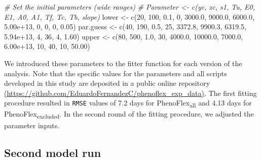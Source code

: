 \documentclass[
]{article}
\newenvironment{Shaded}{\begin{snugshade}}{\end{snugshade}}
\newcommand{\CommentTok}[1]{\textcolor[rgb]{0.56,0.35,0.01}{\textit{#1}}}
\newcommand{\DecValTok}[1]{\textcolor[rgb]{0.00,0.00,0.81}{#1}}
\newcommand{\FloatTok}[1]{\textcolor[rgb]{0.00,0.00,0.81}{#1}}
\newcommand{\FunctionTok}[1]{\textcolor[rgb]{0.00,0.00,0.00}{#1}}
\newcommand{\NormalTok}[1]{#1}
\newcommand{\OtherTok}[1]{\textcolor[rgb]{0.56,0.35,0.01}{#1}}
\begin{document}
\begin{Shaded}
\begin{Highlighting}[]
\CommentTok{\# Set the initial parameters (wide ranges)}
\CommentTok{\# Parameter \textless{}{-} c(yc,  zc,  s1, Tu,     E0,      E1,     A0,         A1,  Tf, Tc, Tb, slope)}
\NormalTok{lower       }\OtherTok{\textless{}{-}} \FunctionTok{c}\NormalTok{(}\DecValTok{20}\NormalTok{, }\DecValTok{100}\NormalTok{, }\FloatTok{0.1}\NormalTok{,  }\DecValTok{0}\NormalTok{, }\FloatTok{3000.0}\NormalTok{,  }\FloatTok{9000.0}\NormalTok{, }\FloatTok{6000.0}\NormalTok{,   }\FloatTok{5.00e+13}\NormalTok{,   }\DecValTok{0}\NormalTok{,  }\DecValTok{0}\NormalTok{,  }\DecValTok{0}\NormalTok{,  }\FloatTok{0.05}\NormalTok{)}
\NormalTok{par.guess   }\OtherTok{\textless{}{-}} \FunctionTok{c}\NormalTok{(}\DecValTok{40}\NormalTok{, }\DecValTok{190}\NormalTok{, }\FloatTok{0.5}\NormalTok{, }\DecValTok{25}\NormalTok{, }\FloatTok{3372.8}\NormalTok{,  }\FloatTok{9900.3}\NormalTok{, }\FloatTok{6319.5}\NormalTok{,   }\FloatTok{5.94e+13}\NormalTok{,   }\DecValTok{4}\NormalTok{, }\DecValTok{36}\NormalTok{,  }\DecValTok{4}\NormalTok{,  }\FloatTok{1.60}\NormalTok{)}
\NormalTok{upper       }\OtherTok{\textless{}{-}} \FunctionTok{c}\NormalTok{(}\DecValTok{80}\NormalTok{, }\DecValTok{500}\NormalTok{, }\FloatTok{1.0}\NormalTok{, }\DecValTok{30}\NormalTok{, }\FloatTok{4000.0}\NormalTok{, }\FloatTok{10000.0}\NormalTok{, }\FloatTok{7000.0}\NormalTok{,   }\FloatTok{6.00e+13}\NormalTok{,  }\DecValTok{10}\NormalTok{, }\DecValTok{40}\NormalTok{, }\DecValTok{10}\NormalTok{, }\FloatTok{50.00}\NormalTok{)}
\end{Highlighting}
\end{Shaded}

We introduced these parameters to the fitter function for each version
of the analysis. Note that the specific values for the parameters and
all scripts developed in this study are deposited in a public online
repository
\href{https://github.com/EduardoFernandezC/phenoflex_exp_data}{(https://github.com/EduardoFernandezC/phenoflex\_exp\_data)}.
The first fitting procedure resulted in \texttt{RMSE} values of 7.2 days
for PhenoFlex\textsubscript{all} and 4.13 days for
PhenoFlex\textsubscript{excluded}. In the second round of the fitting
procedure, we adjusted the parameter inputs.

\hypertarget{second-model-run}{%
\subsection{Second model run}\label{second-model-run}}
\end{document}
